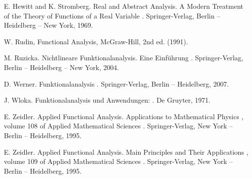 \documentclass[draft=false]{scrreprt}
\begin{document}
\begin{thebibliography}{10}
\bibitem{} E. Hewitt and K. Stromberg. Real and Abstract Analysis. A Modern Treatment of the
Theory of
Functions of a Real Variable . Springer-Verlag, Berlin – Heidelberg – New York,
1969.

\bibitem{}W. Rudin, Functional Analysis, McGraw-Hill, 2nd ed. (1991).
  \label{bib:rudin}

\bibitem{} M. Ruzicka. Nichtlineare Funktionalanalysis. Eine Einf\"uhrung . Springer-Verlag,
Berlin – Heidelberg –
New York, 2004.

\bibitem{}D. Werner. Funktionalanalysis . Springer-Verlag, Berlin – Heidelberg, 2007.

\bibitem{} J. Wloka. Funktionalanalysis und Anwendungen: . De Gruyter, 1971.

\bibitem{} E. Zeidler. Applied Functional Analysis. Applications to Mathematical Physics ,
volume 108 of Applied
Mathematical Sciences . Springer-Verlag, New York – Berlin – Heidelberg, 1995.

\bibitem{} E. Zeidler. Applied Functional Analysis. Main Principles and Their Applications ,
volume 109 of
Applied Mathematical Sciences . Springer-Verlag, New York – Berlin – Heidelberg,
1995.


\end{thebibliography}
\end{document}
